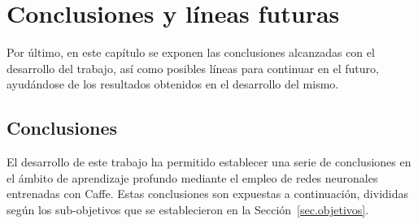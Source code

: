 \chapter{Conclusiones y líneas futuras}\label{cap.conclusiones}
Por último, en este capítulo se exponen las conclusiones alcanzadas con el desarrollo del trabajo, así como posibles líneas para continuar en el futuro, ayudándose de los resultados obtenidos en el desarrollo del mismo.

\section{Conclusiones}
El desarrollo de este trabajo ha permitido establecer una serie de conclusiones en el ámbito de aprendizaje profundo mediante el empleo de redes neuronales entrenadas con Caffe. Estas conclusiones son expuestas a continuación, divididas según los sub-objetivos que se establecieron en la Sección~\ref{sec.objetivos}.
